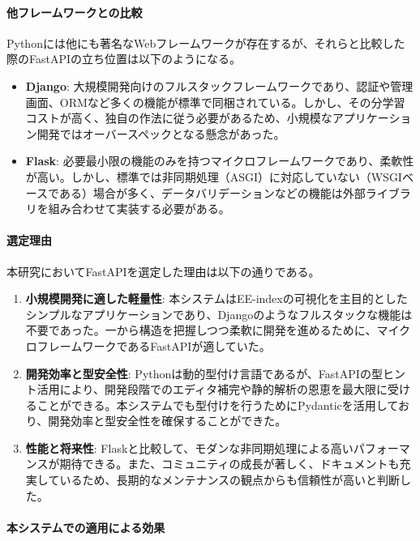 \paragraph{他フレームワークとの比較}
Pythonには他にも著名なWebフレームワークが存在するが、それらと比較した際のFastAPIの立ち位置は以下のようになる。

\begin{itemize}
    \item \textbf{Django}: 大規模開発向けのフルスタックフレームワークであり、認証や管理画面、ORMなど多くの機能が標準で同梱されている。しかし、その分学習コストが高く、独自の作法に従う必要があるため、小規模なアプリケーション開発ではオーバースペックとなる懸念があった。
    \item \textbf{Flask}: 必要最小限の機能のみを持つマイクロフレームワークであり、柔軟性が高い。しかし、標準では非同期処理（ASGI）に対応していない（WSGIベースである）場合が多く、データバリデーションなどの機能は外部ライブラリを組み合わせて実装する必要がある。
\end{itemize}

\paragraph{選定理由}

本研究においてFastAPIを選定した理由は以下の通りである。

\begin{enumerate}
    \item \textbf{小規模開発に適した軽量性}: 本システムはEE-indexの可視化を主目的としたシンプルなアプリケーションであり、Djangoのようなフルスタックな機能は不要であった。一から構造を把握しつつ柔軟に開発を進めるために、マイクロフレームワークであるFastAPIが適していた。
    \item \textbf{開発効率と型安全性}: Pythonは動的型付け言語であるが、FastAPIの型ヒント活用により、開発段階でのエディタ補完や静的解析の恩恵を最大限に受けることができる。本システムでも型付けを行うためにPydanticを活用しており、開発効率と型安全性を確保することができた。
    \item \textbf{性能と将来性}: Flaskと比較して、モダンな非同期処理による高いパフォーマンスが期待できる。また、コミュニティの成長が著しく、ドキュメントも充実しているため、長期的なメンテナンスの観点からも信頼性が高いと判断した。
\end{enumerate}

\paragraph{本システムでの適用による効果}

